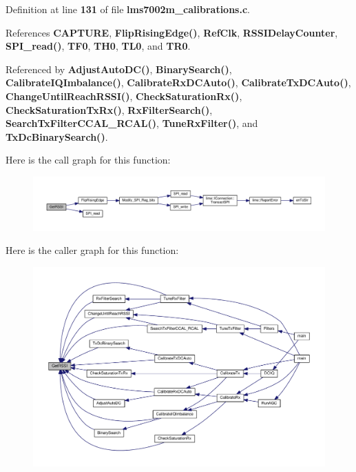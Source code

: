 Definition at line {\bf 131} of file {\bf lms7002m\+\_\+calibrations.\+c}.



References {\bf C\+A\+P\+T\+U\+RE}, {\bf Flip\+Rising\+Edge()}, {\bf Ref\+Clk}, {\bf R\+S\+S\+I\+Delay\+Counter}, {\bf S\+P\+I\+\_\+read()}, {\bf T\+F0}, {\bf T\+H0}, {\bf T\+L0}, and {\bf T\+R0}.



Referenced by {\bf Adjust\+Auto\+D\+C()}, {\bf Binary\+Search()}, {\bf Calibrate\+I\+Q\+Imbalance()}, {\bf Calibrate\+Rx\+D\+C\+Auto()}, {\bf Calibrate\+Tx\+D\+C\+Auto()}, {\bf Change\+Until\+Reach\+R\+S\+S\+I()}, {\bf Check\+Saturation\+Rx()}, {\bf Check\+Saturation\+Tx\+Rx()}, {\bf Rx\+Filter\+Search()}, {\bf Search\+Tx\+Filter\+C\+C\+A\+L\+\_\+\+R\+C\+A\+L()}, {\bf Tune\+Rx\+Filter()}, and {\bf Tx\+Dc\+Binary\+Search()}.



Here is the call graph for this function\+:
\nopagebreak
\begin{figure}[H]
\begin{center}
\leavevmode
\includegraphics[width=350pt]{d3/dec/lms7002m__calibrations_8c_ac781de973d6717ea8f84ba5d3668a9ba_cgraph}
\end{center}
\end{figure}




Here is the caller graph for this function\+:
\nopagebreak
\begin{figure}[H]
\begin{center}
\leavevmode
\includegraphics[width=350pt]{d3/dec/lms7002m__calibrations_8c_ac781de973d6717ea8f84ba5d3668a9ba_icgraph}
\end{center}
\end{figure}



